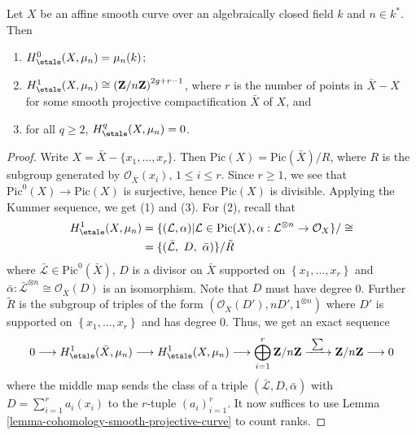 \begin{lemma}
\label{lemma-vanishing-cohomology-mu-smooth-curve}
Let $X$ be an affine smooth curve over an algebraically closed field $k$ and
$n\in k^*$. Then
\begin{enumerate}
\item
$H_\etale^0(X, \mu_n) = \mu_n(k)$;
\item
$H_\etale^1(X, \mu_n) \cong
\left(\mathbf{Z}/n\mathbf{Z}\right)^{2g+r-1}$, where
$r$ is the number of points in $\bar X - X$ for some smooth projective
compactification $\bar X$ of $X$, and
\item
for all $q\geq 2$, $H_\etale^q(X, \mu_n) = 0$.
\end{enumerate}
\end{lemma}

\begin{proof}
Write $X = \bar X - \{ x_1, \ldots, x_r\}$. Then $\text{Pic}(X) =
\text{Pic}(\bar X)/ R$, where $R$ is the subgroup generated by
$\mathcal{O}_{\bar X}(x_i)$, $1 \leq i \leq r$. Since $r \geq 1$, we see that
$\text{Pic}^0(X) \to \text{Pic}(X)$ is surjective, hence $\text{Pic}(X)$ is
divisible. Applying the Kummer sequence, we get (1) and (3). For (2), recall
that
\begin{align*}
H_\etale^1(X, \mu_n)
& =
\{(\mathcal L, \alpha) |
\mathcal L \in \text{Pic}(X),
\alpha : \mathcal{L}^{\otimes n} \to \mathcal{O}_X\}/\cong \\
& =
\{(\bar{\mathcal L},\ D,\ \bar \alpha)\}/\tilde{R}
\end{align*}
where $\bar{\mathcal L} \in \text{Pic}^0(\bar X)$, $D$ is a divisor on $\bar X$
supported on $\left\{x_1, \ldots, x_r\right\}$ and $ \bar{\alpha}:
\bar{\mathcal L}^{\otimes n} \cong \mathcal{O}_{\bar{X}}(D)$ is an isomorphism.
Note that $D$ must have degree 0. Further $\tilde{R}$ is the subgroup of
triples of the form $(\mathcal{O}_{\bar X}(D'), n D', 1^{\otimes n})$ where
$D'$ is supported on $\left\{x_1, \ldots, x_r\right\}$ and has degree 0. Thus,
we get an exact sequence
$$
0 \longrightarrow
H_\etale^1(\bar X, \mu_n) \longrightarrow
H_\etale^1(X, \mu_n) \longrightarrow
\bigoplus_{i = 1}^r \mathbf{Z}/n\mathbf{Z}
\xrightarrow{\ \sum\ }
\mathbf{Z}/n\mathbf{Z} \longrightarrow 0
$$
where the middle map sends the class of a triple $(\bar{ \mathcal L}, D, \bar
\alpha)$ with $D = \sum_{i = 1}^r a_i (x_i)$ to the $r$-tuple
$(a_i)_{i = 1}^r$. It now suffices to use
Lemma \ref{lemma-cohomology-smooth-projective-curve}
to count ranks.
\end{proof}

